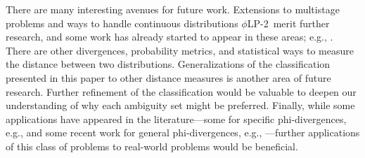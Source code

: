 \documentclass[opre,nonblindrev]{informs3} %
\newcommand{\plp}{$\phi$LP-2}
\begin{document}
There are many interesting avenues for future work. 
Extensions to multistage problems and ways to handle continuous distributions \plp\ merit further research, and some work has already started to appear in these areas; e.g., \cite{hukullback,jiang2015variation}. 
There are other divergences, probability metrics, and statistical ways to measure the distance between two distributions. 
Generalizations of the classification presented in this paper to other distance measures is another area of future research. 
Further refinement of the classification would be valuable to deepen our understanding of why each ambiguity set might be preferred. 
Finally, while some applications have appeared in the literature---some for specific phi-divergences, e.g., \cite{calafiore2007ambiguous,klabjan2013robust} and some recent work for general phi-divergences, e.g., \cite{love_bayraksan_w_15}---further applications of this class of problems to real-world problems would be beneficial. 


\end{document}

